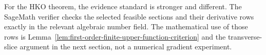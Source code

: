 For the HKO theorem, the evidence standard is stronger and different.  The
SageMath verifier checks the selected feasible sections and their derivative
rows exactly in the relevant algebraic number field.  The mathematical use of
those rows is Lemma~\ref{lem:first-order-finite-upper-function-criterion} and
the transverse-slice argument in the next section, not a numerical gradient
experiment.
